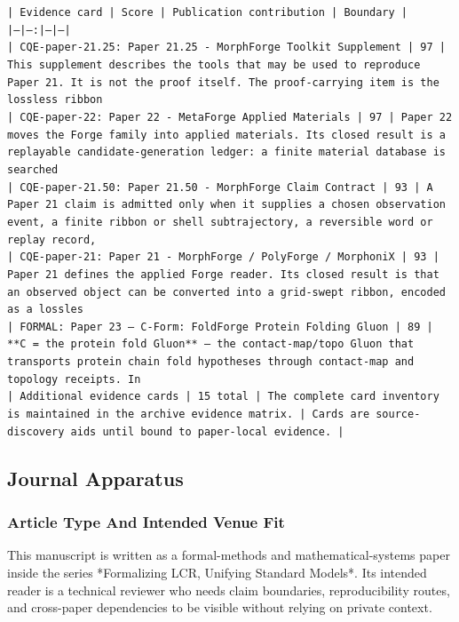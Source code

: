 \documentclass[11pt]{article}
\begin{document}
\noindent\texttt{| Evidence card | Score | Publication contribution | Boundary |}\\
\noindent\texttt{|---|---:|---|---|}\\
\noindent\texttt{| CQE-paper-21.25: Paper 21.25 - MorphForge Toolkit Supplement | 97 | This supplement describes the tools that may be used to reproduce Paper 21. It is not the proof itself. The proof-carrying item is the lossless ribbon}\\
\noindent\texttt{| CQE-paper-22: Paper 22 - MetaForge Applied Materials | 97 | Paper 22 moves the Forge family into applied materials. Its closed result is a replayable candidate-generation ledger: a finite material database is searched }\\
\noindent\texttt{| CQE-paper-21.50: Paper 21.50 - MorphForge Claim Contract | 93 | A Paper 21 claim is admitted only when it supplies a chosen observation event, a finite ribbon or shell subtrajectory, a reversible word or replay record,}\\
\noindent\texttt{| CQE-paper-21: Paper 21 - MorphForge / PolyForge / MorphoniX | 93 | Paper 21 defines the applied Forge reader. Its closed result is that an observed object can be converted into a grid-swept ribbon, encoded as a lossles}\\
\noindent\texttt{| FORMAL: Paper 23 — C-Form: FoldForge Protein Folding Gluon | 89 | **C = the protein fold Gluon** — the contact-map/topo Gluon that transports protein chain fold hypotheses through contact-map and topology receipts. In }\\
\noindent\texttt{| Additional evidence cards | 15 total | The complete card inventory is maintained in the archive evidence matrix. | Cards are source-discovery aids until bound to paper-local evidence. |}\\

\subsection*{Journal Apparatus}

\subsubsection*{Article Type And Intended Venue Fit}

This manuscript is written as a formal-methods and mathematical-systems paper
inside the series *Formalizing LCR, Unifying Standard Models*. Its intended
reader is a technical reviewer who needs claim boundaries, reproducibility
routes, and cross-paper dependencies to be visible without relying on private
context.
\end{document}
